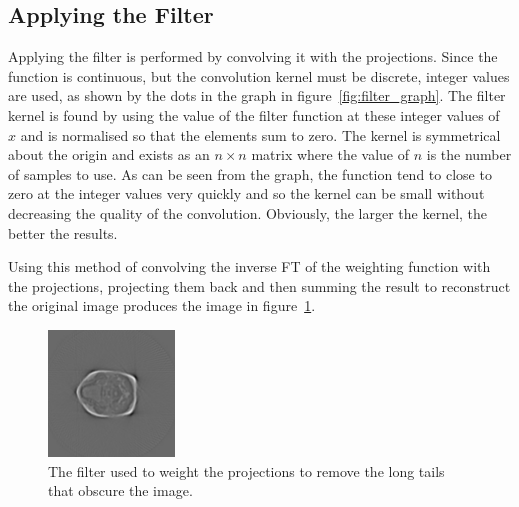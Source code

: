     \subsection{Applying the Filter} %
    \label{sub:applying_the_filter}
        Applying the filter is performed by convolving it with the projections. Since the function is continuous, but the convolution kernel must be discrete, integer values are used, as shown by the dots in the graph in figure~\ref{fig:filter_graph}. The filter kernel is found by using the value of the filter function at these integer values of $x$ and is normalised so that the elements sum to zero. The kernel is symmetrical about the origin and exists as an $n \times n$ matrix where the value of $n$ is the number of samples to use. As can be seen from the graph, the function tend to close to zero at the integer values very quickly and so the kernel can be small without decreasing the quality of the convolution. Obviously, the larger the kernel, the better the results.

        Using this method of convolving the inverse FT of the weighting function with the projections, projecting them back and then summing the result to reconstruct the original image produces the image in figure~\ref{fig:filtered_backprojection}.
        \begin{figure}[ht]
            \centering
                \includegraphics[width=0.3\textwidth]{Files/report_images/reconstructed_image.jpg}
            \caption{The filter used to weight the projections to remove the long tails that obscure the image.\label{fig:filtered_backprojection}}
        \end{figure}



